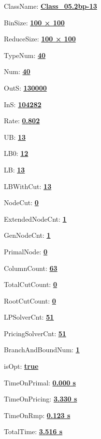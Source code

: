 \documentclass[11pt]{article}
\begin{document}
\pagestyle{empty}


ClassName: \underline{\textbf{Class_05.2bp-13}}
\par
BinSize: \underline{\textbf{100 × 100}}
\par
ReduceSize: \underline{\textbf{100 × 100}}
\par
TypeNum: \underline{\textbf{40}}
\par
Num: \underline{\textbf{40}}
\par
OutS: \underline{\textbf{130000}}
\par
InS: \underline{\textbf{104282}}
\par
Rate: \underline{\textbf{0.802}}
\par
UB: \underline{\textbf{13}}
\par
LB0: \underline{\textbf{12}}
\par
LB: \underline{\textbf{13}}
\par
LBWithCut: \underline{\textbf{13}}
\par
NodeCut: \underline{\textbf{0}}
\par
ExtendedNodeCnt: \underline{\textbf{1}}
\par
GenNodeCnt: \underline{\textbf{1}}
\par
PrimalNode: \underline{\textbf{0}}
\par
ColumnCount: \underline{\textbf{63}}
\par
TotalCutCount: \underline{\textbf{0}}
\par
RootCutCount: \underline{\textbf{0}}
\par
LPSolverCnt: \underline{\textbf{51}}
\par
PricingSolverCnt: \underline{\textbf{51}}
\par
BranchAndBoundNum: \underline{\textbf{1}}
\par
isOpt: \underline{\textbf{true}}
\par
TimeOnPrimal: \underline{\textbf{0.000 s}}
\par
TimeOnPricing: \underline{\textbf{3.330 s}}
\par
TimeOnRmp: \underline{\textbf{0.123 s}}
\par
TotalTime: \underline{\textbf{3.516 s}}
\par
\newpage


\end{document}
